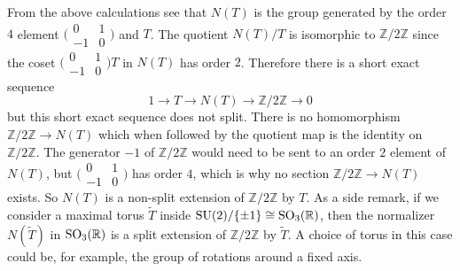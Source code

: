 \documentclass[../../rtnotes.tex]{subfiles}
\begin{document}
From the above calculations see that $N(T)$ is the group generated by the order $4$ element $\bigl(\!\begin{smallmatrix}
    0 & 1 \\ -1 & 0
\end{smallmatrix}\!\bigr)$ and $T$. The quotient $N(T)/T$ is isomorphic to $\mathbb Z/2\mathbb Z$ since the coset $\bigl(\!\begin{smallmatrix}
    0 & 1 \\ -1 & 0
\end{smallmatrix}\!\bigr)T$ in $N(T)$ has order $2$. Therefore there is a short exact sequence 
\[1\to T\to N(T)\to \mathbb Z/2\mathbb Z\to 0\]
but this short exact sequence does not split. There is no homomorphism $\mathbb Z/2\mathbb Z\to N(T)$ which when followed by the quotient map is the identity on $\mathbb Z/2\mathbb Z$. The generator $-1$ of $\mathbb Z/2\mathbb Z$ would need to be sent to an order $2$ element of $N(T)$, but $\bigl(\!\begin{smallmatrix}
    0 & 1 \\ -1 & 0
\end{smallmatrix}\!\bigr)$ has order $4$, which is why no section $\mathbb Z/2\mathbb Z\to N(T)$ exists. So $N(T)$ is a non-split extension of $\mathbb Z/2\mathbb Z$ by $T$. As a side remark, if we consider a maximal torus $\widetilde T$ inside $\operatorname{SU}(2)/\{\pm 1\}\cong \operatorname{SO}_3(\mathbb R)$, then the normalizer $N(\widetilde T)$ in $ \operatorname{SO}_3(\mathbb R)$ is a split extension of $\mathbb Z/2\mathbb Z$ by $\widetilde T$. A choice of torus in this case could be, for example, the group of rotations around a fixed axis.

\end{document}
